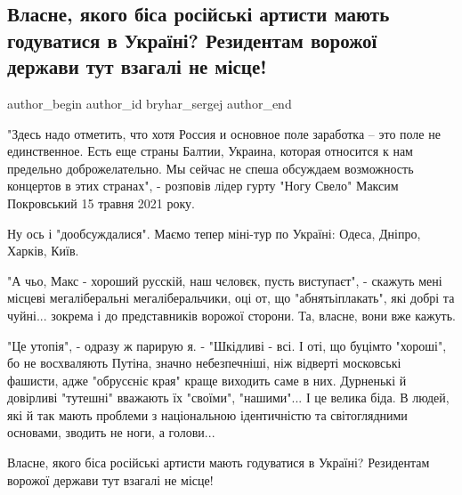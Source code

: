  
 
 
 
 
 
\subsection{Власне, якого біса російські артисти мають годуватися в Україні? Резидентам ворожої держави тут взагалі не місце!}
\label{sec:06_09_2021.fb.bryhar_sergej.1.rus_artisty_ukraina}
 
\ifcmt
 author_begin
   author_id bryhar_sergej
 author_end
\fi

"Здесь надо отметить, что хотя Россия и основное поле заработка – это поле не
единственное. Есть еще страны Балтии, Украина, которая относится к нам
предельно доброжелательно. Мы сейчас не спеша обсуждаем возможность концертов в
этих странах", - розповів лідер гурту "Ногу Свело" Максим Покровський 15 травня
2021 року.


Ну ось і "дообсуждалися". Маємо тепер міні-тур по Україні: Одеса, Дніпро,
Харків, Київ.

"А чьо, Макс - хороший русскій, наш чєловєк, пусть виступаєт", - скажуть мені
місцеві мегаліберальні мегаліберальчики, оці от, що "абнятьіплакать", які добрі
та чуйні... зокрема і до представників ворожої сторони. Та, власне, вони вже
кажуть. 

"Це утопія", - одразу ж парирую я. - "Шкідливі - всі. І оті, що буцімто
"хороші", бо не восхваляють Путіна, значно небезпечніші, ніж відверті
московські фашисти, адже "обрусєніє края" краще виходить саме в них. Дурненькі
й довірливі "тутешні" вважають їх "своїми", "нашими"... І це велика біда. В
людей, які й так мають проблеми з національною ідентичністю та світоглядними
основами, зводить не ноги, а голови...

Власне, якого біса російські артисти мають годуватися в Україні? Резидентам
ворожої держави тут взагалі не місце!

